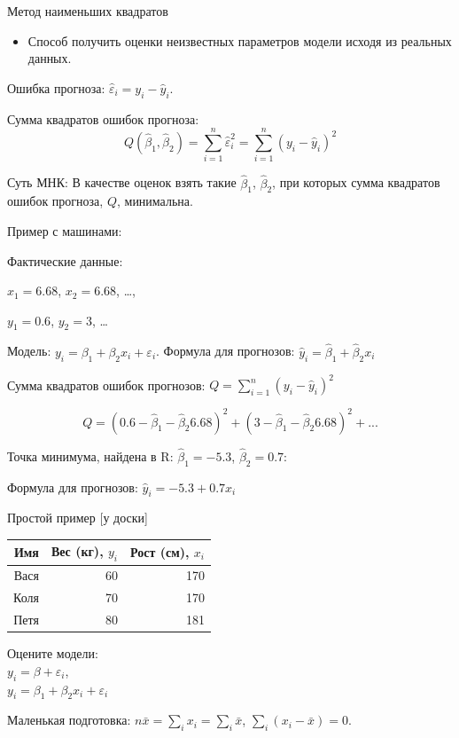 \begin{frame}{Метод наименьших квадратов}

\begin{itemize}
\tightlist
\item
  Способ получить оценки неизвестных параметров модели исходя из
  реальных данных.
\end{itemize}

Ошибка прогноза: \(\hat{\varepsilon}_i=y_i-\hat{y}_i\).

Сумма квадратов ошибок прогноза: \[
Q(\hat{\beta}_1,\hat{\beta}_2)=\sum_{i=1}^n \hat{\varepsilon}_i^2=\sum_{i=1}^n (y_i-\hat{y}_i)^2
\]

Суть МНК: В качестве оценок взять такие \(\hat{\beta}_1\),
\(\hat{\beta}_2\), при которых сумма квадратов ошибок прогноза, \(Q\),
минимальна.

\end{frame}

\begin{frame}{Пример с машинами:}

Фактические данные:

\(x_1=6.68\), \(x_2=6.68\), \ldots{},

\(y_1=0.6\), \(y_2=3\), \ldots{}

Модель: \(y_i=\beta_1+\beta_2 x_i+\varepsilon_i\). Формула для
прогнозов: \(\hat{y}_i=\hat{\beta}_1 + \hat{\beta}_2 x_i\)

Сумма квадратов ошибок прогнозов: \(Q=\sum_{i=1}^n (y_i-\hat{y}_i)^2\)

\[
Q=(0.6-\hat{\beta}_1-\hat{\beta}_2 6.68)^2+(3-\hat{\beta}_1-\hat{\beta}_2 6.68)^2+...
\]

Точка минимума, найдена в R: \(\hat{\beta}_1=-5.3\),
\(\hat{\beta}_2=0.7\):

Формула для прогнозов: \(\hat{y}_i=-5.3 + 0.7 x_i\)

\end{frame}

\begin{frame}{Простой пример {[}у доски{]}}

\begin{longtable}[c]{@{}rrr@{}}
\toprule
Имя & Вес (кг), \(y_i\) & Рост (см), \(x_i\)\tabularnewline
\midrule
\endhead
Вася & 60 & 170\tabularnewline
Коля & 70 & 170\tabularnewline
Петя & 80 & 181\tabularnewline
\bottomrule
\end{longtable}

Оцените модели:\\
\(y_i=\beta +\varepsilon_i\),\\
\(y_i=\beta_1+\beta_2 x_i +\varepsilon_i\)

Маленькая подготовка: \(n\bar{x}=\sum_i x_i=\sum_i \bar{x}\),
\(\sum_i (x_i - \bar{x})=0\).

\end{frame}

